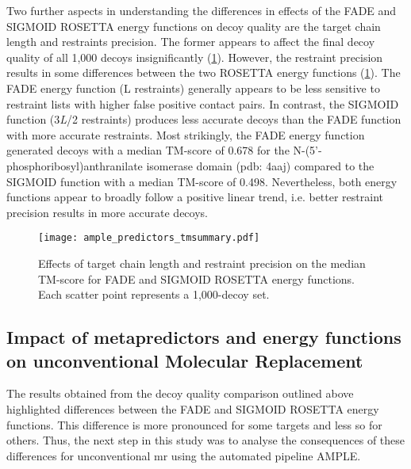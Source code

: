 Two further aspects in understanding the differences in effects of the FADE and SIGMOID ROSETTA energy functions on decoy quality are the target chain length and restraints precision. The former appears to affect the final decoy quality of all 1,000 decoys insignificantly (\cref{fig:ample_predictor_tmsummary}). However, the restraint precision results in some differences between the two ROSETTA energy functions (\cref{fig:ample_predictor_tmsummary}). The FADE energy function (L restraints) generally appears to be less sensitive to restraint lists with higher false positive contact pairs.  In contrast, the SIGMOID function  (3\textit{L}/2 restraints) produces less accurate decoys than the FADE function with more accurate restraints. Most strikingly, the FADE energy function generated decoys with a median TM-score of 0.678 for the N-(5'-phosphoribosyl)anthranilate isomerase domain (\gls{pdb}: 4aaj) compared to the SIGMOID function with a median TM-score of 0.498. Nevertheless, both energy functions appear to broadly follow a positive linear trend, i.e. better restraint precision results in more accurate decoys.

\begin{figure}[H]
    \centering
    \texttt{[image: ample\_predictors\_tmsummary.pdf]}
    \caption{Effects of target chain length and restraint precision on the median TM-score for FADE and SIGMOID ROSETTA energy functions. Each scatter point represents a 1,000-decoy set.}
    \label{fig:ample_predictor_tmsummary}
\end{figure}

\subsection{Impact of metapredictors and energy functions on unconventional Molecular Replacement}
The results obtained from the decoy quality comparison outlined above highlighted differences between the FADE and SIGMOID ROSETTA energy functions. This difference is more pronounced for some targets and less so for others. Thus, the next step in this study was to analyse the consequences  of these differences for unconventional \gls{mr} using the automated pipeline AMPLE.


